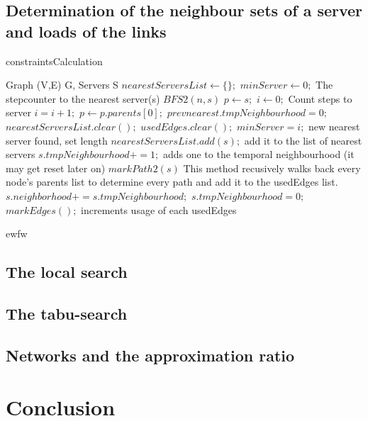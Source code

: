 \documentclass [12pt]{article}
\begin{document}
    \subsection{Determination of the neighbour sets of a server and loads of the links}
    \begin{algorithm}[H]
        \caption{constraintsCalculation}
        \begin{algorithmic}[1]
            \Require Graph (V,E) G, Servers S
                    \State $nearestServersList \gets \{\};$ 
                    \State $minServer \gets 0;$ \Comment The stepcounter to the nearest server(s)
                        \State $BFS2(n,s)$
                        \State $p \gets s;$
                        \State $i \gets 0;$ \Comment Count steps to server
                            \State $i=i+1;$
                            \State $p \gets p.parents[0];$
                        \EndWhile
                                    \State $prevnearest.tmpNeighbourhood=0;$
                                    \State $nearestServersList.clear();$
                                    \State $usedEdges.clear();$
                                \EndFor
                            \EndIf
                            \State $minServer = i;$ \Comment new nearest server found, set length
                            \State $nearestServersList.add(s);$ \Comment add it to the list of nearest servers 
                            \State $s.tmpNeighbourhood += 1;$ \Comment adds one to the temporal neighbourhood (it may get reset later on)
                            \State $markPath2(s)$ \Comment This method recusively walks back every node's parents list to determine every path and add it to the usedEdges list.
                        \EndIf 
                    \EndFor
                            \State $s.neighborhood += s.tmpNeighbourhood;$
                            \State $s.tmpNeighbourhood = 0;$
                        \EndFor
                    \State $markEdges();$ \Comment increments usage of each usedEdges
                \EndIf
            \EndFor
        \end{algorithmic}
    \end{algorithm}
ewfw
    \subsection{The local search}
    \subsection{The tabu-search}
    \subsection{Networks and the approximation ratio}
\section{Conclusion}


\end{document}
